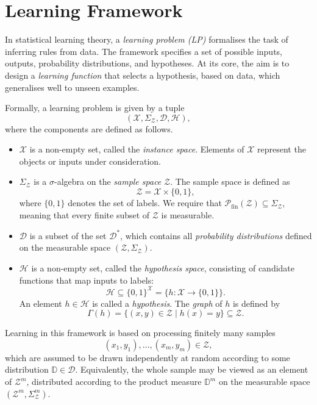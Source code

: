 \section{Learning Framework}

In statistical learning theory, a \emph{learning problem (LP)} formalises the task of inferring rules from data.
The framework specifies a set of possible inputs, outputs, probability distributions, and hypotheses.
At its core, the aim is to design a \emph{learning function} that selects a hypothesis, based on data,
which generalises well to unseen examples.

Formally, a learning problem is given by a tuple
\[
    (\mathcal{X}, \Sigma_{\mathcal{Z}}, \mathcal{D}, \mathcal{H}),
\]
where the components are defined as follows.

\begin{itemize}
    \item $\mathcal{X}$ is a non-empty set, called the \emph{instance space}. Elements of $\mathcal{X}$ represent the objects or inputs under consideration.

    \item $\Sigma_{\mathcal{Z}}$ is a $\sigma$-algebra on the \emph{sample space} $\mathcal{Z}$. The sample space is defined as
    \[
        \mathcal{Z} = \mathcal{X} \times \{0,1\},
    \]
    where $\{0,1\}$ denotes the set of labels.
    We require that $\mathcal{P}_{\mathrm{fin}}(\mathcal{Z}) \subseteq \Sigma_{\mathcal{Z}}$, meaning that every finite subset of $\mathcal{Z}$ is measurable.

    \item $\mathcal{D}$ is a subset of the set $\mathcal{D}^*$, which contains all \emph{probability distributions} defined on the measurable space $(\mathcal{Z}, \Sigma_{\mathcal{Z}})$.

    \item $\mathcal{H}$ is a non-empty set, called the \emph{hypothesis space}, consisting of candidate functions that map inputs to labels:
    \[
        \mathcal{H} \subseteq \{0,1\}^\mathcal{X} = \{h : \mathcal{X} \to \{0,1\}\}.
    \]
    An element $h \in \mathcal{H}$ is called a \emph{hypothesis}.
    The \emph{graph} of $h$ is defined by
    \[
        \Gamma(h) = \{(x,y) \in \mathcal{Z} \mid h(x) = y\} \subseteq \mathcal{Z}.
    \]
\end{itemize}

\medskip

Learning in this framework is based on processing finitely many samples
\[
    (x_1,y_1),\dots,(x_m,y_m) \in \mathcal{Z},
\]
which are assumed to be drawn independently at random according to some distribution $\mathbb{D} \in \mathcal{D}$.
Equivalently, the whole sample may be viewed as an element of $\mathcal{Z}^m$, distributed according to the product measure $\mathbb{D}^m$ on the measurable space $(\mathcal{Z}^m,\Sigma_{\mathcal{Z}}^m)$.

